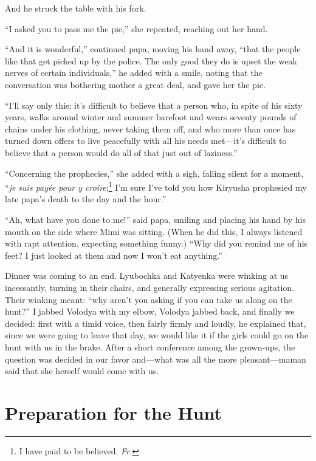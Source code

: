 And he struck the table with his fork.

``I asked you to pass me the pie,'' she repeated, reaching out her hand.

``And it is wonderful,'' continued papa, moving his hand away, ``that the people like that get picked up by the police. The only good they do is upset the weak nerves of certain individuals,'' he added with a smile, noting that the conversation was bothering mother a great deal, and gave her the pie.

``I'll say only this: it's difficult to believe that a person who, in spite of his sixty years, walks around winter and summer barefoot and wears seventy pounds of chains under his clothing, never taking them off, and who more than once has turned down offers to live peacefully with all his needs met---it's difficult to believe that a person would do all of that just out of laziness.'' %

``Concerning the prophecies,'' she added with a sigh, falling silent for a moment, ``\textit{je suis pay\'ee pour y croire};\footnote{I have paid to be believed. \textit{Fr.}}  I'm sure I've told you how Kiryusha prophesied my late papa's death to the day and the hour.'' %

``Ah, what have you done to me!'' said papa, smiling and placing his hand by his mouth on the side where Mimi was sitting. (When he did this, I always listened with rapt attention, expecting something funny.) ``Why did you remind me of his feet? I just looked at them and now I won't eat anything.'' %

Dinner was coming to an end. Lyubochka and Katyenka were winking at us incessantly, turning in their chairs, and generally expressing serious agitation. Their winking meant: ``why aren't you asking if you can take us along on the hunt?'' I jabbed Volodya with my elbow, Volodya jabbed back, and finally we decided: first with a timid voice, then fairly firmly and loudly, he explained that, since we were going to leave that day, we would like it if the girls could go on the hunt with us in the brake.  After a short conference among the grown-ups, the question was decided in our favor and---what was all the more pleasant---maman said that she herself would come with us.

\chapter{Preparation for the Hunt} %

